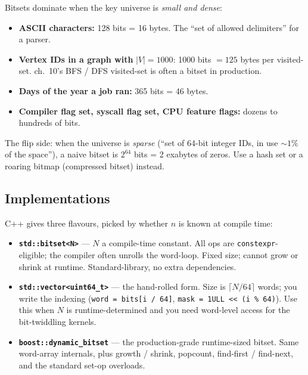 \documentclass[11pt]{article}
\begin{document}
\begin{notebox}
Bitsets dominate when the key universe is \emph{small and dense}:
\begin{itemize}[leftmargin=*]
    \item \textbf{ASCII characters:} 128 bits = 16 bytes. The
          ``set of allowed delimiters'' for a parser.
    \item \textbf{Vertex IDs in a graph with} $|V| = 1000$:
          1000 bits $= 125$ bytes per visited-set. ch.~10's BFS /
          DFS visited-set is often a bitset in production.
    \item \textbf{Days of the year a job ran:} 365 bits = 46 bytes.
    \item \textbf{Compiler flag set, syscall flag set, CPU
          feature flags:} dozens to hundreds of bits.
\end{itemize}
The flip side: when the universe is \emph{sparse}
(``set of 64-bit integer IDs, in use $\sim 1\%$ of the space''), a
naive bitset is $2^{64}$ bits = 2 exabytes of zeros. Use a hash set
or a roaring bitmap (compressed bitset) instead.
\end{notebox}

\subsection*{Implementations}

C++ gives three flavours, picked by whether $n$ is known at compile
time:

\begin{itemize}[leftmargin=*]
    \item \textbf{\texttt{std::bitset<N>}} --- $N$ a compile-time
          constant. All ops are \texttt{constexpr}-eligible; the
          compiler often unrolls the word-loop. Fixed size; cannot
          grow or shrink at runtime. Standard-library, no extra
          dependencies.
    \item \textbf{\texttt{std::vector<uint64\_t>}} --- the
          hand-rolled form. Size is $\lceil N / 64 \rceil$ words;
          you write the indexing
          (\texttt{word = bits[i / 64]}, \texttt{mask = 1ULL << (i \% 64)}).
          Use this when $N$ is runtime-determined and you need
          word-level access for the bit-twiddling kernels.
    \item \textbf{\texttt{boost::dynamic\_bitset}} --- the
          production-grade runtime-sized bitset. Same word-array
          internals, plus growth / shrink, popcount, find-first /
          find-next, and the standard set-op overloads.
\end{itemize}
\end{document}
